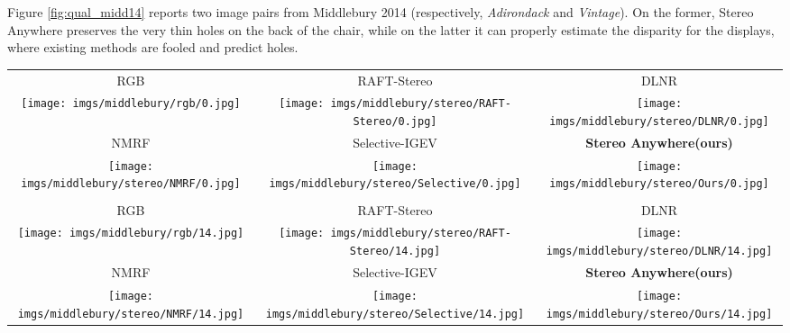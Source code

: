 \documentclass[10pt,twocolumn,letterpaper]{article}
\newcommand{\method}[0]{Stereo Anywhere\xspace}
\begin{document}
\clearpage

Figure \ref{fig:qual_midd14} reports two image pairs from Middlebury 2014 (respectively, \textit{Adirondack} and \textit{Vintage}). On the former, \method preserves the very thin holes on the back of the chair, while on the latter it can properly estimate the disparity for the displays, where existing methods are fooled and predict holes.

\begin{figure*}[h]
    \centering
    \renewcommand{\tabcolsep}{1pt}
    \begin{tabular}{ccc}
        \small RGB &
        \small RAFT-Stereo \cite{lipson2021raft} &
        \small DLNR \cite{zhao2023high} \\
        \texttt{[image: imgs/middlebury/rgb/0.jpg]} &
        \texttt{[image: imgs/middlebury/stereo/RAFT-Stereo/0.jpg]} &
        \texttt{[image: imgs/middlebury/stereo/DLNR/0.jpg]} \\
        \small NMRF \cite{guan2024neural} &
        \small Selective-IGEV \cite{wang2024selective} &
        \textbf{\method (ours)} \\
        \texttt{[image: imgs/middlebury/stereo/NMRF/0.jpg]} &
        \texttt{[image: imgs/middlebury/stereo/Selective/0.jpg]} &
        \texttt{[image: imgs/middlebury/stereo/Ours/0.jpg]} \\ \\
        \small RGB &
        \small RAFT-Stereo \cite{lipson2021raft} &
        \small DLNR \cite{zhao2023high} \\
        \texttt{[image: imgs/middlebury/rgb/14.jpg]} &
        \texttt{[image: imgs/middlebury/stereo/RAFT-Stereo/14.jpg]} &
        \texttt{[image: imgs/middlebury/stereo/DLNR/14.jpg]} \\
        \small NMRF \cite{guan2024neural} &
        \small Selective-IGEV \cite{wang2024selective} &
        \textbf{\method (ours)} \\
        \texttt{[image: imgs/middlebury/stereo/NMRF/14.jpg]} &
        \texttt{[image: imgs/middlebury/stereo/Selective/14.jpg]} &
        \texttt{[image: imgs/middlebury/stereo/Ours/14.jpg]} \\
    \end{tabular}

    \caption{\textbf{Qualitative Results -- Middlebury 2014.} Predictions by state-of-the-art models and \method.}
    \label{fig:qual_midd14}\vspace{-0.3cm}

\end{figure*}
\end{document}
